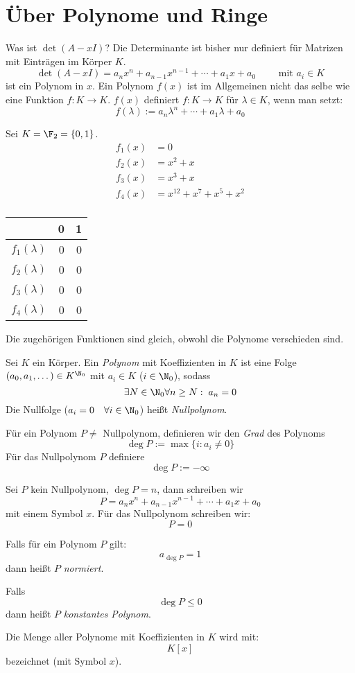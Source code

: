 \documentclass[a4paper, 10pt]{scrbook}
\begin{document}
\section{Über Polynome und Ringe}

Was ist $\det(A-xI)$?
Die Determinante ist bisher nur definiert für Matrizen mit Einträgen im Körper $K$.
\[
\det(A-xI)=a_nx^n+a_{n-1}x^{n-1}+\dotsb+a_1x+a_0 \qquad \text{ mit }a_i \in K
\]
ist ein Polynom in $x$.
Ein Polynom $f(x)$ ist im Allgemeinen nicht das selbe wie eine Funktion $f:K\to K$.
$f(x)$ definiert $f:K\to K$ für $\lambda\in K$, wenn man setzt:
\[
f(\lambda):= a_n\lambda^n+\dotsb+a_1\lambda+a_0
\]

\begin{ex}
Sei $K=\F_2=\{0,1\}$.
\begin{align*}
f_1(x)&=0\\
f_2(x)&=x^2+x\\
f_3(x)&=x^3+x\\
f_4(x)&=x^{12}+x^{7}+x^5+x^2\\
\end{align*}
\begin{table}[h]
\begin{tabular}{l|r|r}
 & 0 & 1\\
\hline
$f_1(\lambda)$ & 0 & 0\\
$f_2(\lambda)$ & 0 & 0\\
$f_3(\lambda)$ & 0 & 0\\
$f_4(\lambda)$ & 0 & 0
\end{tabular}
\end{table}

Die zugehörigen Funktionen sind gleich, obwohl die Polynome verschieden sind.
\end{ex}

\begin{df}
\label{df:10.6}
Sei $K$ ein Körper.
Ein \emph{Polynom} mit Koeffizienten in $K$ ist eine Folge $(a_0, a_1, \dotsc)\in K^{\N_0}$ mit
$a_i\in K$ ($i\in \N_0$), sodass
\[
\exists N\in \N_0 \forall n\ge N:\; a_n=0
\]
Die Nullfolge ($a_i=0 \quad\forall i\in\N_0$) heißt \emph{Nullpolynom}.

Für ein Polynom $P\neq$ Nullpolynom, definieren wir den \emph{Grad} des Polynoms
\[
\deg P:= \max\{i:a_i\neq 0\}
\]
Für das Nullpolynom $P$ definiere
\[
\deg P:= -\infty
\]

Sei $P$ kein Nullpolynom, $\deg P=n$, dann schreiben wir
\[
P=a_nx^n + a_{n-1}x^{n-1} + \dotsb + a_1x + a_0
\]
mit einem Symbol $x$.
Für das Nullpolynom schreiben wir:
\[
P=0
\]

Falls für ein Polynom $P$ gilt:
\[
a_{\deg P}=1
\]
dann heißt $P$ \emph{normiert}.

Falls
\[
\deg P\le 0
\]
dann heißt $P$ \emph{konstantes Polynom}.

Die Menge aller Polynome mit Koeffizienten in $K$ wird mit:
\[
K[x]
\]
bezeichnet (mit Symbol $x$).
\end{df}
\end{document}
